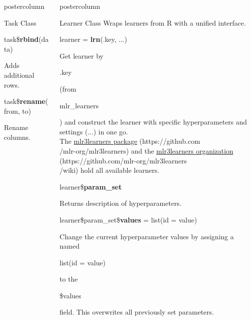 \documentclass{beamer}
\newlength{\columnheight} %
\newcommand{\codeinline}[1]{\begin{codeboxinline}#1\end{codeboxinline}}
\begin{document}
\begin{frame}[fragile]{}
\begin{columns}
\begin{column}{.245\textwidth}
\begin{beamercolorbox}[center]{postercolumn}
\begin{minipage}{.98\textwidth}
{\begin{myblock}{Task Class}
							\\
							\begin{codebox}
								task\$\textbf{rbind}(data)
							\end{codebox}
							Adds additional rows.
							\\
							\begin{codebox}
								task\$\textbf{rename}(from, to)
							\end{codebox}
							Rename columns.
						\end{myblock}
					\vfill}
				\end{minipage}
			\end{beamercolorbox}
		\end{column}
		\begin{column}{.245\textwidth}
			\begin{beamercolorbox}[center]{postercolumn}
				\begin{minipage}{.98\textwidth}
					\parbox[t][\columnheight]{\textwidth}{
						\begin{myblock}{Learner Class}
							Wraps learners from R with a unified interface.
							\\
							\begin{codebox}
								learner = \textbf{lrn}(.key, ...)
							\end{codebox}
							Get learner by \codeinline{.key} (from \codeinline{mlr\_learners}) 
							and construct the learner with specific hyperparameters and settings (...) in one go.\\
							The \href{https://github.com/mlr-org/mlr3learners}{mlr3learners package} (https://github.com\\/mlr-org/mlr3learners)
							and the \href{https://github.com/mlr-org/mlr3learners/wiki}{mlr3learners organization} (https://github.com/mlr-org/mlr3learners\\/wiki)
							hold all available learners.
							\\
							\begin{codebox}
								learner\$\textbf{param\_set}
							\end{codebox}
							Returns description of hyperparameters.	
							\\
							\begin{codebox}
								learner\$param\_set\$\textbf{values} = list(id = value)
							\end{codebox}
							Change the current hyperparameter values by assigning a named \codeinline{list(id = value)} to the \codeinline{\$values} field.
							This overwrites all previously set parameters.	

\end{myblock}}
\end{minipage}
\end{beamercolorbox}
\end{column}
\end{columns}
\end{frame}
\end{document}
